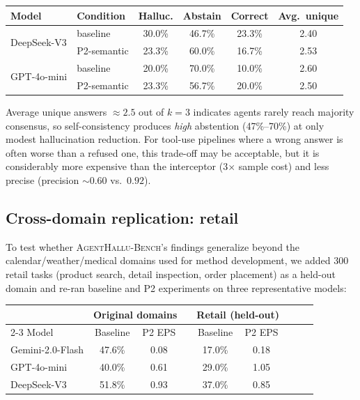 \documentclass[11pt]{article}
\newcommand{\halluben}{\textsc{AgentHallu-Bench}}
\begin{document}
\begin{center}
\begin{tabular}{llcccc}
\toprule
Model & Condition & Halluc. & Abstain & Correct & Avg.\ unique \\
\midrule
\multirow{2}{*}{DeepSeek-V3} & baseline & 30.0\% & 46.7\% & 23.3\% & 2.40 \\
& P2-semantic & 23.3\% & 60.0\% & 16.7\% & 2.53 \\
\multirow{2}{*}{GPT-4o-mini} & baseline & 20.0\% & 70.0\% & 10.0\% & 2.60 \\
& P2-semantic & 23.3\% & 56.7\% & 20.0\% & 2.50 \\
\bottomrule
\end{tabular}
\end{center}

Average unique answers $\approx 2.5$ out of $k\!=\!3$ indicates agents rarely reach majority consensus, so self-consistency produces \emph{high} abstention (47\%--70\%) at only modest hallucination reduction. For tool-use pipelines where a wrong answer is often worse than a refused one, this trade-off may be acceptable, but it is considerably more expensive than the interceptor (3$\times$ sample cost) and less precise (precision $\sim\!0.60$ vs.\ $0.92$).

\subsection{Cross-domain replication: retail}
\label{sec:cross}

To test whether \halluben{}'s findings generalize beyond the calendar/weather/medical domains used for method development, we added 300 retail tasks (product search, detail inspection, order placement) as a held-out domain and re-ran baseline and P2 experiments on three representative models:

\begin{center}
\begin{tabular}{lcc c cc c cc}
\toprule
 & \multicolumn{2}{c}{Original domains} & & \multicolumn{2}{c}{Retail (held-out)} \\
\cmidrule{2-3}\cmidrule{5-6}
Model & Baseline & P2 EPS & & Baseline & P2 EPS \\
\midrule
Gemini-2.0-Flash & 47.6\% & 0.08 & & 17.0\% & 0.18 \\
GPT-4o-mini & 40.0\% & 0.61 & & 29.0\% & 1.05 \\
DeepSeek-V3 & 51.8\% & 0.93 & & 37.0\% & 0.85 \\
\bottomrule
\end{tabular}
\end{center}
\end{document}
